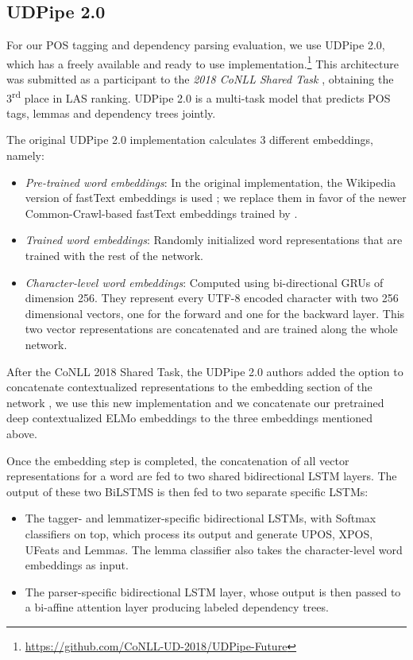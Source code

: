 \subsection{UDPipe 2.0} \label{udpipe-future}

For our POS tagging and dependency parsing evaluation, we use UDPipe 2.0, which has a freely available and ready to use implementation.\footnote{\url{https://github.com/CoNLL-UD-2018/UDPipe-Future}} This architecture was submitted as a participant to the \emph{2018 CoNLL Shared Task} \citep{zeman-etal-2018-conll}, obtaining the 3\textsuperscript{rd} place in LAS ranking. UDPipe 2.0 is a multi-task model that predicts POS tags, lemmas and dependency trees jointly.

The original UDPipe 2.0 implementation calculates 3 different embeddings, namely:

\begin{itemize}
    \item \emph{Pre-trained word embeddings}: In the original implementation, the Wikipedia version of fastText embeddings is used \citep{bojanowski-etal-2017-enriching}; we replace them in favor of the newer Common-Crawl-based fastText embeddings trained by \citet{grave-etal-2018-learning}.
    \item \emph{Trained word embeddings}: Randomly initialized word representations that are trained with the rest of the network.
    \item \emph{Character-level word embeddings}: Computed using bi-directional GRUs of dimension 256. They represent every UTF-8 encoded character with two 256 dimensional vectors, one for the forward and one for the backward layer. This two vector representations are concatenated and are trained along the whole network.
\end{itemize}

After the CoNLL 2018 Shared Task, the UDPipe 2.0 authors added the option to concatenate contextualized representations to the embedding section of the network \citep{straka-strakova-2019-evaluating}, we use this new implementation and we concatenate our pretrained deep contextualized ELMo embeddings to the three embeddings mentioned above.

Once the embedding step is completed, the concatenation of all vector representations for a word are fed to two shared bidirectional LSTM \citep{hochreiter-schmidhuber-1997-long} layers. The output of these two BiLSTMS is then fed to two separate specific LSTMs:
\begin{itemize}
    \item The tagger- and lemmatizer-specific bidirectional LSTMs, with Softmax classifiers on top, which process its output and generate UPOS, XPOS, UFeats and Lemmas. The lemma classifier also takes the character-level word embeddings as input.

    \item The parser-specific bidirectional LSTM layer, whose output is then passed to a bi-affine attention layer \citep{dozat-manning-2017-deep} producing labeled dependency trees.
\end{itemize}

